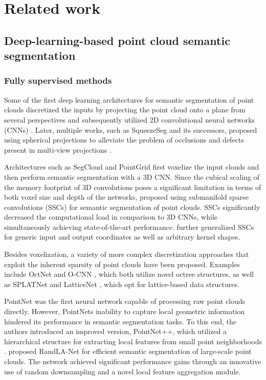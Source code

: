 \section{Related work}
\label{section:related_work}

\subsection{Deep-learning-based point cloud semantic segmentation}

\subsubsection{Fully supervised methods}

Some of the first deep learning architectures for semantic segmentation of point clouds discretized the inputs by projecting the point cloud onto a plane from several perspectives and subsequently utilized 2D convolutional neural networks (CNNs) \citep{su2015multiview,boulch2018snapnet}. Later, multiple works, such as SqueezeSeg and its successors, proposed using spherical projections to alleviate the problem of occlusions and defects present in multi-view projections \citep{wu2018squeezeseg,wu2019squeezesegv2,milioto2019rangenet++,xu2020squeezesegv3}.

Architectures such as SegCloud \citep{tchapmi2017segcloud} and PointGrid \citep{le2018pointgrid} first voxelize the input clouds and then perform semantic segmentation with a 3D CNN. Since the cubical scaling of the memory footprint of 3D convolutions poses a significant limitation in terms of both voxel size and depth of the networks, \cite{graham20183d} proposed using submanifold sparse convolutions (SSCs) for semantic segmentation of point clouds. SSCs significantly decreased the computational load in comparison to 3D CNNs, while simultaneously achieving state-of-the-art performance. \cite{choy20194d} further generalized SSCs for generic input and output coordinates as well as arbitrary kernel shapes.

Besides voxelization, a variety of more complex discretization approaches that exploit the inherent sparsity of point clouds have been proposed. Examples include OctNet \citep{riegler2017octnet} and O-CNN \citep{wang2017ocnn}, which both utilize novel octree structures, as well as SPLATNet \citep{su2018splatnet} and LatticeNet \citep{rosu2019latticenet}, which opt for lattice-based data structures.

PointNet \citep{qi2017pointnet} was the first neural network capable of processing raw point clouds directly. However, PointNets inability to capture local geometric information hindered its performance in semantic segmentation tasks. To this end, the authors introduced an improved version, PointNet++, which utilized a hierarchical structure for extracting local features from small point neighborhoods  \citep{qi2017pointnet++}. \cite{hu2020randlanet} proposed RandLA-Net for efficient semantic segmentation of large-scale point clouds. The network achieved significant performance gains through an innovative use of random downsampling and a novel local feature aggregation module.

